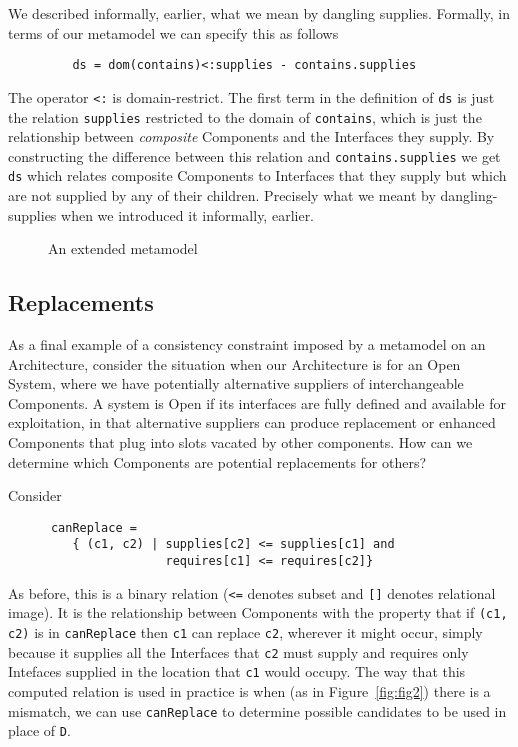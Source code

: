 \documentclass{llncs}
\begin{document}
\noindent We described informally, earlier, what we mean by dangling supplies. Formally, in terms of our metamodel we can specify this as follows
\begin{small}
\begin{verbatim}
         ds = dom(contains)<:supplies - contains.supplies
\end{verbatim}
\end{small}
The operator {\small\verb$<:$} is domain-restrict. The first term in the definition of {\small\verb$ds$} is just the relation {\small\verb$supplies$} restricted to the domain of {\small\verb$contains$}, which is just the relationship between {\em composite} Components and the Interfaces they supply. By constructing the difference between this relation and {\small\verb$contains.supplies$} we get {\small\verb$ds$} which relates composite Components to Interfaces that they supply but which are not supplied by any of their children. Precisely what we meant by dangling-supplies when we introduced it informally, earlier.


%
\begin{figure}[t]
  \centering
   {}
  \caption{An extended metamodel}
  \label{fig:fig4}
\end{figure}
%

\subsection{Replacements}

\noindent As a final example of a consistency constraint imposed by a metamodel on an Architecture, consider the situation when our Architecture is for an Open System, where we have potentially alternative suppliers of interchangeable Components. A system is Open if its interfaces are fully defined and available for exploitation, in that alternative suppliers can produce replacement or enhanced Components that plug into slots vacated by other components. How can we determine which Components are potential replacements for others?

Consider 
\begin{small}
\begin{verbatim}
      canReplace = 
         { (c1, c2) | supplies[c2] <= supplies[c1] and  
                      requires[c1] <= requires[c2]} 
\end{verbatim}
\end{small}
As before, this is a binary relation ({\small\verb$<=$} denotes subset and {\small\verb$[]$} denotes relational image). It is the relationship between Components with the property that if {\small\verb$(c1, c2)$} is in
 {\small\verb$canReplace$} then {\small\verb$c1$} can replace {\small\verb$c2$}, wherever it might occur, simply because it supplies all the Interfaces that {\small\verb$c2$} must supply and requires only Intefaces supplied in the location that {\small\verb$c1$} would occupy. The way that this computed relation is used in practice is when (as in Figure~\ref{fig:fig2}) there is a mismatch, we can use {\small\verb$canReplace$} to determine possible candidates to be used in place of {\small\verb$D$}. 
\end{document}
